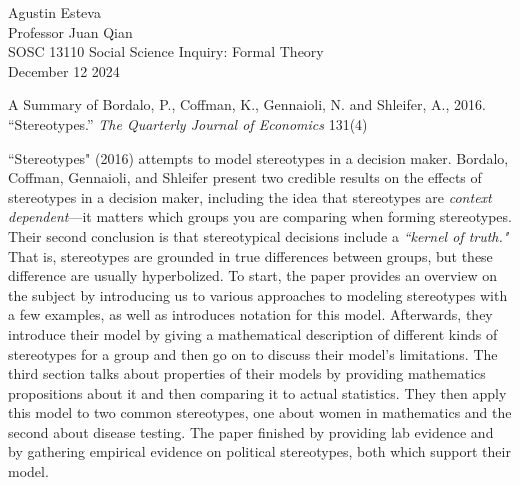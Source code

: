 \documentclass[12pt]{article}
\theoremstyle{definition}
\numberwithin{equation}{section}
\begin{document}
\begin{flushleft}

Agustin Esteva\\
Professor Juan Qian\\
SOSC 13110 Social Science Inquiry: Formal Theory\\
December 12 2024\\


\begin{center}
A Summary of Bordalo, P., Coffman, K., Gennaioli, N. and Shleifer, A., 2016. ``Stereotypes.” \textit{The
Quarterly Journal of Economics} 131(4)
\end{center}


\setlength{\parindent}{0.5in}
``Stereotypes" (2016)\cite{Stereotypes} attempts to model stereotypes in a decision maker. Bordalo, Coffman, Gennaioli, and Shleifer present two credible results on the effects of stereotypes in a decision maker, including the idea that stereotypes are \textit{context dependent}---it matters which groups you are comparing when forming stereotypes. Their second conclusion is that stereotypical decisions include a \textit{``kernel of truth."} That is, stereotypes are grounded in true differences between groups, but these difference are usually hyperbolized. To start, the paper provides an overview on the subject by introducing us to various approaches to modeling stereotypes with a few examples, as well as introduces notation for this model. Afterwards, they introduce their model by giving a mathematical description of different kinds of stereotypes for a group and then go on to discuss their model's limitations. The third section talks about properties of their models by providing mathematics propositions about it and then comparing it to actual statistics. They then apply this model to two common stereotypes, one about women in mathematics and the second about disease testing. The paper finished by providing lab evidence and by gathering empirical evidence on political stereotypes, both which support their model.


\end{flushleft}
\end{document}
